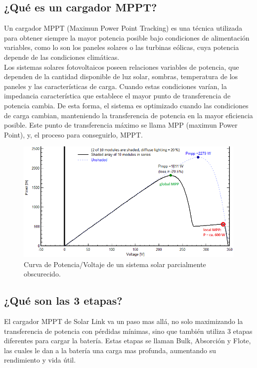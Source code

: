 \subsection{¿Qué es un cargador MPPT?}

Un cargador MPPT (Maximun Power Point Tracking) es una técnica utilizada para obtener siempre la mayor potencia posible bajo condiciones de alimentación variables, como lo son los paneles solares o las turbinas eólicas, cuya potencia depende de las condiciones climáticas.\\

Los sistemas solares fotovoltaicos poseen relaciones variables de potencia, que dependen de la cantidad disponible de luz solar, sombras, temperatura de los paneles y las características de carga. Cuando estas condiciones varían, la impedancia característica que establece el mayor punto de transferencia de potencia cambia. De esta forma, el sistema es optimizado cuando las condiciones de carga cambian, manteniendo la transferencia de potencia en la mayor eficiencia posible. Este punto de transferencia máximo se llama MPP (maximun Power Point), y, el proceso para conseguirlo, MPPT.\\

\begin{figure} [H]
    \centering
    \includegraphics[width=0.95\linewidth]{MPPT/UP-curve_of_partially_shaded_solar_generator.png}
    \caption{Curva de Potencia/Voltaje de un sistema solar parcialmente obscurecido.}
\end{figure}

\subsection{¿Qué son las 3 etapas?}

El cargador MPPT de Solar Link va un paso mas allá, no solo maximizando la transferencia de potencia con pérdidas mínimas, sino que también utiliza 3 etapas diferentes para cargar la batería. Estas etapas se llaman Bulk, Absorción y Flote, las cuales le dan a la batería una carga mas profunda, aumentando su rendimiento y vida útil. \\


